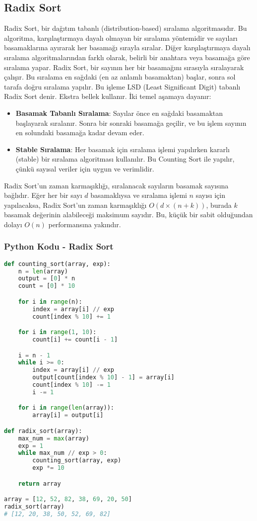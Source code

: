 \newpage

\subsection{Radix Sort}

Radix Sort, bir dağıtım tabanlı (distribution-based) sıralama algoritmasıdır. Bu algoritma, karşılaştırmaya dayalı olmayan bir sıralama yöntemidir ve sayıları basamaklarına ayırarak her basamağı sırayla sıralar. Diğer karşılaştırmaya dayalı sıralama algoritmalarından farklı olarak, belirli bir anahtara veya basamağa göre sıralama yapar. Radix Sort, bir sayının her bir basamağını sırasıyla sıralayarak çalışır. Bu sıralama en sağdaki (en az anlamlı basamaktan) başlar, sonra sol tarafa doğru sıralama yapılır. Bu işleme LSD (Least Significant Digit) tabanlı Radix Sort denir. Ekstra bellek kullanır. İki temel aşamaya dayanır:

\begin{itemize}
    \item \textbf{Basamak Tabanlı Sıralama}: Sayılar önce en sağdaki basamaktan başlayarak sıralanır. Sonra bir sonraki basamağa geçilir, ve bu işlem sayının en solundaki basamağa kadar devam eder.
    \item \textbf{Stable Sıralama}: Her basamak için sıralama işlemi yapılırken kararlı (stable) bir sıralama algoritması kullanılır. Bu Counting Sort ile yapılır, çünkü sayısal veriler için uygun ve verimlidir.
\end{itemize}

Radix Sort’un zaman karmaşıklığı, sıralanacak sayıların basamak sayısına bağlıdır. Eğer her bir sayı $d$ basamaklıysa ve sıralama işlemi $n$ sayısı için yapılacaksa, Radix Sort’un zaman karmaşıklığı $O(d \times (n + k))$, burada $k$ basamak değerinin alabileceği maksimum sayıdır. Bu, küçük bir sabit olduğundan dolayı $O(n)$ performansına yakındır.

\subsubsection{Python Kodu - Radix Sort}

\begin{lstlisting}[language=Python]
def counting_sort(array, exp):
    n = len(array)
    output = [0] * n
    count = [0] * 10

    for i in range(n):
        index = array[i] // exp
        count[index % 10] += 1

    for i in range(1, 10):
        count[i] += count[i - 1]

    i = n - 1
    while i >= 0:
        index = array[i] // exp
        output[count[index % 10] - 1] = array[i]
        count[index % 10] -= 1
        i -= 1

    for i in range(len(array)):
        array[i] = output[i]

def radix_sort(array):
    max_num = max(array)
    exp = 1
    while max_num // exp > 0:
        counting_sort(array, exp)
        exp *= 10

    return array

array = [12, 52, 82, 38, 69, 20, 50]
radix_sort(array)
# [12, 20, 38, 50, 52, 69, 82]
\end{lstlisting}

